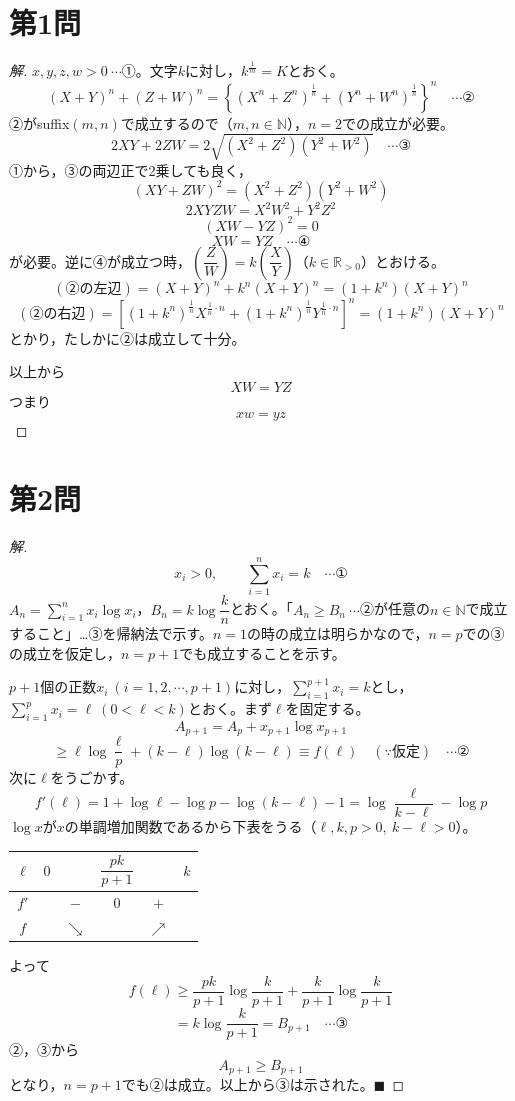 \documentclass[../main.tex]{subfiles}
\begin{document}
\section*{第1問}

\begin{proof}[解]
  $x,y,z,w>0\ \cdots$①。文字$k$に対し，$k^{\frac1m}=K$とおく。
  \[
    (X+Y)^n+(Z+W)^n=\left\{(X^n+Z^n)^{\frac1n}+(Y^n+W^n)^{\frac1n}\right\}^n \quad\cdots\text{②}
  \]
  ②がsuffix$(m,n)$で成立するので（$m,n\in\mathbb{N}$），$n=2$での成立が必要。
  \[
    2XY+2ZW=2\sqrt{(X^2+Z^2)(Y^2+W^2)} \quad\cdots\text{③}
  \]
  ①から，③の両辺正で2乗しても良く，
  \[
    (XY+ZW)^2=(X^2+Z^2)(Y^2+W^2)
  \]
  \[
    2XYZW=X^2W^2+Y^2Z^2
  \]
  \[
    (XW-YZ)^2=0
  \]
  \[
    XW=YZ \quad\cdots\text{④}
  \]
  が必要。逆に④が成立つ時，$\left(\dfrac{Z}{W}\right)=k\left(\dfrac{X}{Y}\right)$（$k\in\mathbb{R}_{>0}$）とおける。
  \[
    (\text{②の左辺})=(X+Y)^n+k^n(X+Y)^n=(1+k^n)(X+Y)^n
  \]
  \[
    (\text{②の右辺})=\left[(1+k^n)^{\frac1n}X^{\frac1n\cdot n}+(1+k^n)^{\frac1n}Y^{\frac1n\cdot n}\right]^n=(1+k^n)(X+Y)^n
  \]
  とかり，たしかに②は成立して十分。

  以上から
  \[
    XW=YZ
  \]
  つまり
  \[
    xw=yz
  \]
\end{proof}

\newpage

\section*{第2問}

\begin{proof}[解]
  \[
    x_i>0, \qquad \sum_{i=1}^nx_i=k \quad\cdots\text{①}
  \]
  $A_n=\displaystyle\sum_{i=1}^nx_i\log x_i$，$B_n=k\log\dfrac{k}{n}$とおく。「$A_n\ge B_n\ \cdots$②が任意の$n\in\mathbb{N}$で成立すること」…③を帰納法で示す。$n=1$の時の成立は明らかなので，$n=p$での③の成立を仮定し，$n=p+1$でも成立することを示す。

  $p+1$個の正数$x_i\ (i=1,2,\cdots,p+1)$に対し，$\displaystyle\sum_{i=1}^{p+1}x_i=k$とし，$\displaystyle\sum_{i=1}^px_i=\ell\ (0<\ell<k)$とおく。まず$\ell$を固定する。
  \[
    A_{p+1}=A_p+x_{p+1}\log x_{p+1}
  \]
  \[
    \ge\ell\log\frac{\ell}{p}+(k-\ell)\log(k-\ell)\equiv f(\ell) \quad(\because\text{仮定}) \quad\cdots\text{②}
  \]
  次に$\ell$をうごかす。
  \[
    f'(\ell)=1+\log\ell-\log p-\log(k-\ell)-1=\log\frac{\ell}{k-\ell}-\log p
  \]
  $\log x$が$x$の単調増加関数であるから下表をうる（$\ell,k,p>0,\ k-\ell>0$）。
  \begin{center}
    \begin{tabular}{c|ccccc}
      $\ell$ & $0$ & & $\dfrac{pk}{p+1}$ & & $k$ \\
      \hline
      $f'$ & & $-$ & $0$ & $+$ & \\
      \hline
      $f$ & & $\searrow$ & & $\nearrow$ &
    \end{tabular}
  \end{center}
  よって
  \[
    f(\ell)\ge\frac{pk}{p+1}\log\frac{k}{p+1}+\frac{k}{p+1}\log\frac{k}{p+1}
  \]
  \[
    =k\log\frac{k}{p+1}=B_{p+1} \quad\cdots\text{③}
  \]
  ②，③から
  \[
    A_{p+1}\ge B_{p+1}
  \]
  となり，$n=p+1$でも②は成立。以上から③は示された。$\blacksquare$
\end{proof}
\end{document}
